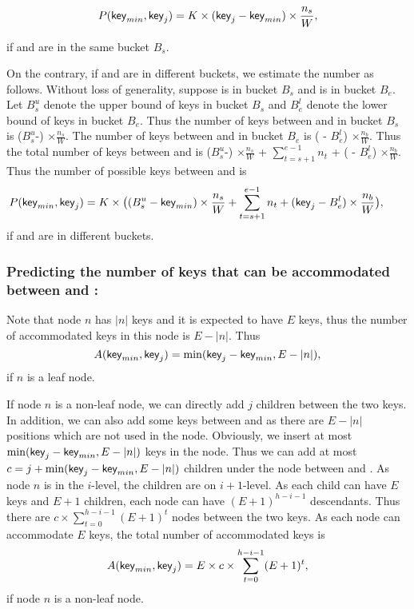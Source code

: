 \begin{equation}
P(\textsf{key}_{min}, \textsf{key}_{j}) = K \times  (\textsf{key}_{j} - \textsf{key}_{min}) \times \frac{n_s}{W},
\end{equation}

\noindent if \el and  are in the same bucket $B_s$.

On the contrary, if \el and  are in different buckets, we estimate the number as follows. Without loss of generality, suppose \el is in bucket $B_s$ and  is in bucket $B_e$. Let $B_s^u$ denote the upper bound of keys in bucket $B_s$ and $B_e^l$ denote the lower bound of keys in bucket $B_e$. Thus the number of keys between \el and  in bucket $B_s$ is ($B_s^u$-\el) $\times \frac{n_s}{W}$. The number of keys between \el and  in bucket $B_e$ is ( - $B_e^l$) $\times \frac{n_b}{W}$. Thus the total number of keys between \el and  is ($B_s^u$-\el) $\times \frac{n_s}{W}$ + $\sum_{t=s+1}^{e-1} n_t$ + ( - $B_e^l$) $\times \frac{n_b}{W}$. Thus the number of possible keys between \el and  is
\begin{equation}\hspace*{-2em}P(\el, \key{j}) = K \times \bigl( (B_s^u-\el) \times \frac{n_s}{W} + \sum_{t=s+1}^{e-1} n_t + (\key{j} - B_e^l) \times \frac{n_b}{W} \bigr),
\end{equation}
\noindent if \el and  are in different buckets.


\mbox{}

\subsubsection{Predicting the number of keys that can be accommodated between \el and :} 

Note that node $n$ has $|n|$ keys and it is expected to have $E$ keys, thus the number of accommodated keys in this node is $E-|n|$. Thus $$A(\textsf{key}_{min}, \textsf{key}_{j}) = \min(\textsf{key}_{j}-\textsf{key}_{min}, E-|n|),$$ if $n$ is a leaf node.

If node $n$ is a non-leaf node, we can directly add $j$ children between the two keys. In addition, we can also add some keys between \el and  as there are $E-|n|$ positions which are not used in the node. Obviously, we insert
at most $\min(\textsf{key}_{j}-\textsf{key}_{min}, E-|n|)$ keys in the node. Thus we can add at most
$c=j+\min(\textsf{key}_{j}-\textsf{key}_{min}, E-|n|)$ children under the node between \el and . As node $n$ is in the $i$-level, the children are on $i+1$-level. As each child can have $E$ keys and $E+1$ children, each node can have $(E+1)^{h-i-1}$ descendants. Thus there are $c\times \sum_{t=0}^{h-i-1}(E+1)^t$ nodes between the two keys. As each node can accommodate $E$ keys, the total number of accommodated keys is
\begin{equation}
A(\textsf{key}_{min}, \textsf{key}_{j})=E\times c\times \sum_{t=0}^{h-i-1}(E+1)^t,
\end{equation}
\noindent if node $n$ is a non-leaf node.


